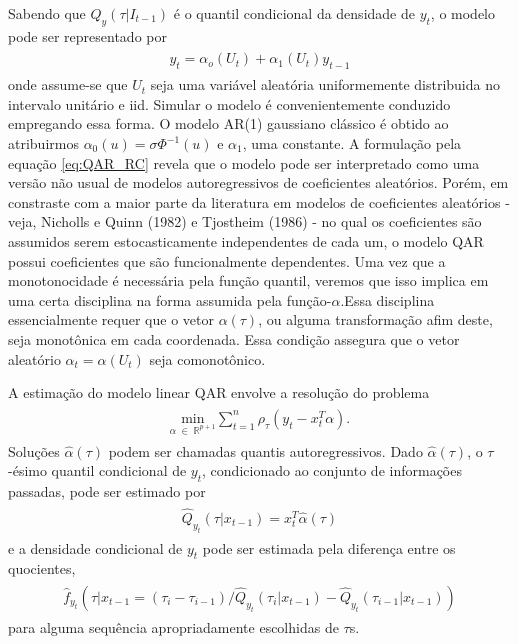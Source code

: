 \documentclass[paper=a4, fontsize=11pt]{scrartcl}
\numberwithin{equation}{section}		%
\numberwithin{figure}{section}			%
\numberwithin{table}{section}				%
\begin{document}
Sabendo que $Q_{y}(\tau|I_{t-1}) $ é o quantil condicional da densidade de $y_{t}$, o modelo pode ser representado por
\begin{align} 
	\begin{split}
	y_{t} = \alpha_{o}(U_{t})+\alpha_{1}(U_{t})y_{t-1} \label{eq:QAR_RC}
	\end{split}					
\end{align}
{\parindent0pt onde assume-se que $U_{t}$ seja uma variável aleatória uniformemente distribuida no intervalo unitário e iid. Simular o modelo é convenientemente conduzido empregando essa forma. O modelo AR(1) gaussiano clássico é obtido ao atribuirmos $\alpha_{0}(u)=\sigma\Phi^{-1}(u)$ e $\alpha_{1}$, uma constante. A formulação pela equação \eqref{eq:QAR_RC} revela que o modelo pode ser interpretado como uma versão não usual de modelos autoregressivos de coeficientes aleatórios. Porém, em constraste com a maior parte da literatura em modelos de coeficientes aleatórios - veja, Nicholls e Quinn (1982) e Tjostheim (1986) - no qual os coeficientes são assumidos serem estocasticamente independentes de cada um, o modelo QAR possui coeficientes que são funcionalmente dependentes. Uma vez que a monotonocidade é necessária pela função quantil, veremos que isso implica em uma certa disciplina na forma assumida pela função-$\alpha$.Essa disciplina essencialmente requer que o vetor $\alpha(\tau)$, ou alguma transformação afim deste, seja monotônica em cada coordenada. Essa condição assegura que o vetor aleatório $\alpha_{t}=\alpha(U_{t})$ seja comonotônico.}

A estimação do modelo linear QAR envolve a resolução do problema
\vspace{-10pt}
\begin{align} 
	\begin{split}
	\underset{\alpha \; \in \; \mathbb{R}^{p+1} }{\text{min}} \sum_{t=1}^{n} \rho_{\tau}(y_{t}-x_{t}^{T}\alpha). \label{eq:min_QAR}
	\end{split}					
\end{align}
Soluções $\hat{\alpha}(\tau)$ podem ser chamadas quantis autoregressivos. Dado $\hat{\alpha}(\tau)$, o $\tau$-ésimo quantil condicional de $y_{t}$, condicionado ao conjunto de informações passadas, pode ser estimado por
\vspace{-10pt}
\begin{align} 
	\begin{split}
	\hat{Q}_{y_{t}}(\tau|x_{t-1}) = x_{t}^{T}\hat{\alpha}(\tau) \label{eq:QAR_matr2}
	\end{split}					
\end{align}
{\parindent0pt e a densidade condicional de $y_t$ pode ser estimada pela diferença entre os quocientes,}
\vspace{-10pt}
\begin{align} 
	\begin{split}
	\hat{f}_{y_{t}}(\tau|x_{t-1} = (\tau_{i}-\tau_{i-1})/\hat{Q}_{y_{t}}(\tau_{i}|x_{t-1})-\hat{Q}_{y_{t}}(\tau_{i-1}|x_{t-1}) )          \label{eq:QAR_densid}
	\end{split}					
\end{align}
{\parindent0pt para alguma sequência apropriadamente escolhidas de $\tau $s.}
\end{document}
